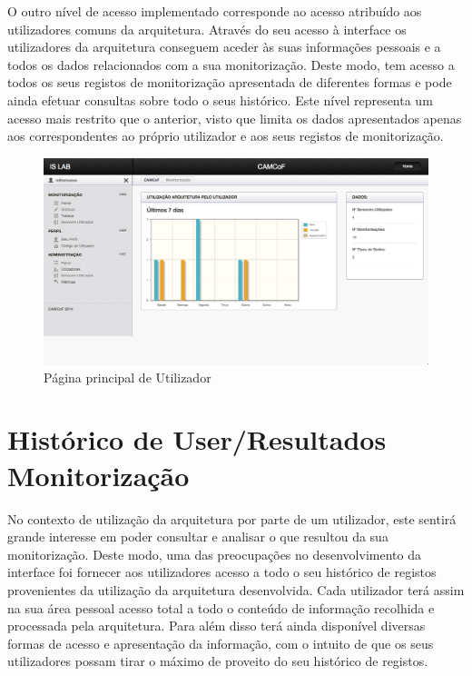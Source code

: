 O outro nível de acesso implementado corresponde ao acesso atribuído aos utilizadores comuns da arquitetura. Através do seu acesso à interface os utilizadores da arquitetura conseguem aceder às suas informações pessoais e a todos os dados relacionados com a sua monitorização. Deste modo, tem acesso a todos os seus registos de monitorização apresentada de diferentes formas e pode ainda efetuar consultas sobre todo o seus histórico. Este nível representa um acesso mais restrito que o anterior, visto que limita os dados apresentados apenas aos correspondentes ao próprio utilizador e aos seus registos de monitorização.

 \begin{figure}[htb]
   \centering
   \includegraphics[scale=0.29]{Images/home.png}
   \caption{Página principal de Utilizador}
\end{figure}

\section{Histórico de User/Resultados Monitorização}

No contexto de utilização da arquitetura por parte de um utilizador, este sentirá grande interesse em poder consultar e analisar o que resultou da sua monitorização. Deste modo, uma das preocupações no desenvolvimento da interface foi fornecer aos utilizadores acesso a todo o seu histórico de registos provenientes da utilização da arquitetura desenvolvida. Cada utilizador terá assim na sua área pessoal acesso total a todo o conteúdo de informação recolhida e processada pela arquitetura. Para além disso terá ainda disponível diversas formas de acesso e apresentação da informação, com o intuito de que os seus utilizadores possam tirar o máximo de proveito do seu histórico de registos.

